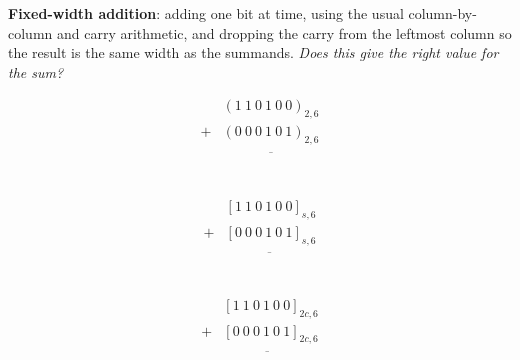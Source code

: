 \documentclass[12pt, oneside]{article}
\begin{document}
{\bf Fixed-width addition}: adding one bit at time, using the usual column-by-column and carry arithmetic, and dropping the carry from the leftmost column so the result is the same width as the summands.  {\it Does this give the right value for the sum?}
\begin{multicols}{3}
\begin{align*}
   & (1~ 1~ 0~ 1~ 0~ 0)_{2,6}\\
+ & (0~ 0~ 0~ 1~ 0~ 1)_{2,6}\\
&\overline{\phantom{(1~1~1~0~0~1)_{2,6}}}\\
\end{align*}

\begin{align*}
   & [1~ 1~ 0~ 1~ 0~ 0]_{s,6}\\
+ & [0~ 0~ 0~ 1~ 0~ 1]_{s,6}\\
&\overline{\phantom{(1~1~1~0~0~1)_2}}\\
\end{align*}

\begin{align*}
   & [1~ 1~ 0~ 1~ 0~ 0]_{2c,6}\\
+ & [0~ 0~ 0~ 1~ 0~ 1]_{2c,6}\\
&\overline{\phantom{(1~1~1~0~0~1)_2}}\\
\end{align*}
\end{multicols} \newpage
\end{document}
